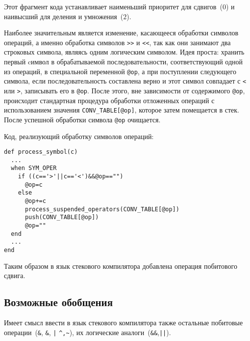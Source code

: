 Этот фрагмент кода устанавливает наименьший приоритет для сдвигов~($0$) и наивысший для
деления и умножения~($2$).

Наиболее значительным является изменение, касающееся обработки символов операций,
а именно обработка символов \verb|>>| и \verb|<<|, так как они занимают два
строковых символа, являясь одним логическим символом. Идея проста: хранить первый
cимвол в обрабатываемой последовательности, соответствующий одной из операций, в
специальной переменной \verb|@op|, а при поступлении следующего символа, если
последовательность составлена верно и этот символ совпадает с
\verb|<| или \verb|>|, записывать его в \verb|@op|. После этого, вне зависимости
от содержимого \verb|@op|, происходит стандартная процедура обработки отложенных
операций с использованием значения \verb|CONV_TABLE[@op]|, которое затем
помещается в стек. После успешной обработки символа \verb|@op| очищается.

\newpage

Код, реализующий обработку символов операций:
\begin{lstlisting}
def process_symbol(c)
  ...
  when SYM_OPER
    if ((c=='>'||c=='<')&&@op=="")
      @op=c
    else
      @op+=c
      process_suspended_operators(CONV_TABLE[@op])
      push(CONV_TABLE[@op])
      @op=""
  end
  ...
end
\end{lstlisting}

Таким образом в язык стекового компилятора добавлена операция побитового сдвига.
\subsection{Возможные обобщения}
Имеет смысл ввести в язык стекового компилятора также остальные побитовые
операции~(\verb|&|, \texttt{\&}, \texttt{|} \verb|^,~|), их логические
аналоги~(\verb|&&|,\texttt{||}).

